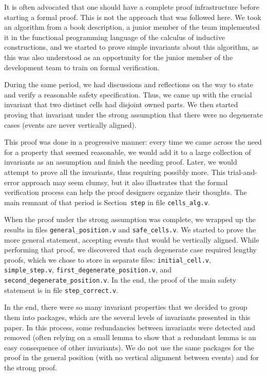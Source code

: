\documentclass[a4paper, USenglish, cleveref, autoref, thm-restate, final]{lipics-v2021}
\begin{document}
It is often advocated that one should have a complete proof
infrastructure before starting a formal proof.  This is not the
approach that was followed here.  We took an algorithm from a book
description, a junior member of the team implemented it in the
functional programming language of the calculus of inductive
constructions, and we started to prove simple invariants about this
algorithm, as this was also understood as an opportunity for the junior
member of the development team to train on formal verification.

During the same period, we had discussions and reflections on the way to
state and verify a reasonable safety specification.  Thus, we came up with the
crucial invariant that two distinct cells had disjoint owned parts.  We then
started proving that invariant under the strong assumption that there
were no degenerate cases (events are never vertically aligned).

This proof was done in a progressive manner: every time we came
across the need for a property that seemed reasonable, we would add it to
a large collection of invariants as an assumption and finish the needing proof.
Later, we would attempt to prove all the invariants, thus requiring possibly
more.  This trial-and-error approach may seem clumsy, but it also illustrates
that the formal verification process can help the proof designers organize
their thoughts.  The main remnant of that period is Section~{\tt step} in
file {\tt cells\_alg.v}.

When the proof under the strong assumption was complete, we wrapped up the
results in files {\tt general\_position.v} and {\tt safe\_cells.v}.
We started to prove the more general statement, accepting events that
would be vertically
aligned.  While performing that proof, we discovered that each degenerate
case required lengthy proofs, which we chose to store in separate files:
{\tt initial\_cell.v}, {\tt simple\_step.v},
{\tt first\_degenerate\_position.v}, and
{\tt second\_degenerate\_position.v}.  In the end, the proof of the main
safety statement is in file {\tt step\_correct.v}.

In the end, there were so many invariant properties that we decided to group
them into packages, which are the several levels of invariants presented
in this paper.  In this process, some redundancies between invariants were
detected and removed (often relying on a small lemma to show that a redundant
lemma is an easy consequence of other invariants).  We do not use the same
packages for the proof in the general position (with no vertical alignment
between events) and for the strong proof.
\end{document}
